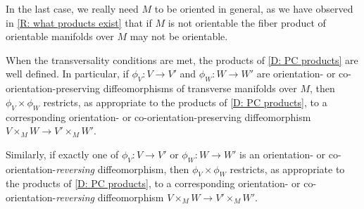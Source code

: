 In the last case, we really need $M$ to be oriented in general, as we have observed in \cref{R: what products exist} that if $M$ is not orientable the fiber product of orientable manifolds over $M$ may not be orientable.

\begin{lemma}\label{L: product preserves iso}
	When the transversality conditions are met, the products of \cref{D: PC products} are well defined.
	In particular, if $\phi_V \colon V \to V'$ and $\phi_W \colon W \to W'$ are orientation- or co-orientation-preserving diffeomorphisms of transverse manifolds over $M$, then $\phi_V \times \phi_W$ restricts, as appropriate to the products of \cref{D: PC products}, to a corresponding orientation- or co-orientation-preserving diffeomorphism $V \times_M W \to V' \times_M W'$.

	Similarly, if exactly one of $\phi_V \colon V \to V'$ or $\phi_W \colon W \to W'$ is an orientation- or co-orientation-\textit{reversing} diffeomorphism, then $\phi_V \times \phi_W$ restricts, as appropriate to the products of \cref{D: PC products}, to a corresponding orientation- or co-orientation-\textit{reversing} diffeomorphism $V \times_M W \to V' \times_M W'$.
\end{lemma}
